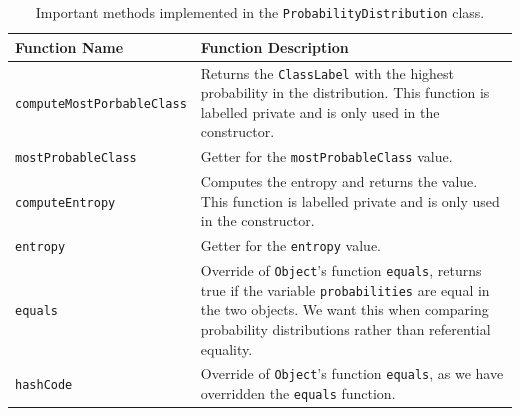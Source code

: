\documentclass[12pt,twoside,notitlepage]{report}
\begin{document}
                \begin{table}[H]
                    \begin{tabularx}{\textwidth}{l|X}
                        \textbf{Function Name} & \textbf{Function Description} \\
                        \hline

                        \texttt{computeMostPorbableClass} & 
                            Returns the \texttt{ClassLabel} with the highest probability in the distribution. This 
                            function is labelled private and is only used in the constructor. \\ 
                        \hline

                        \texttt{mostProbableClass} & 
                            Getter for the \texttt{mostProbableClass} value. \\ 
                        \hline

                        \texttt{computeEntropy} & 
                            Computes the entropy and returns the value. This function is labelled private and is only 
                            used in the constructor. \\ 
                        \hline

                        \texttt{entropy} & 
                            Getter for the \texttt{entropy} value. \\ 
                        \hline

                        \texttt{equals} & 
                            Override of \texttt{Object}'s function \texttt{equals}, returns true if the variable 
                            \texttt{probabilities} are equal in the two objects. We want this when comparing 
                            probability distributions rather than referential equality. \\ 
                        \hline

                        \texttt{hashCode} & 
                            Override of \texttt{Object}'s function \texttt{equals}, as we have overridden the 
                            \texttt{equals} function. \\ 

                    \end{tabularx}
                    \caption{Important methods implemented in the \texttt{ProbabilityDistribution} class.}
                    \label{tab:ProbabilityDistribution}
                \end{table}
\end{document}

